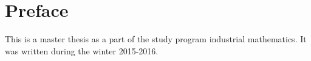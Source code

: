 \section*{Preface}
This is a master thesis as a part of the study program industrial mathematics. It was written during the winter 2015-2016. 



